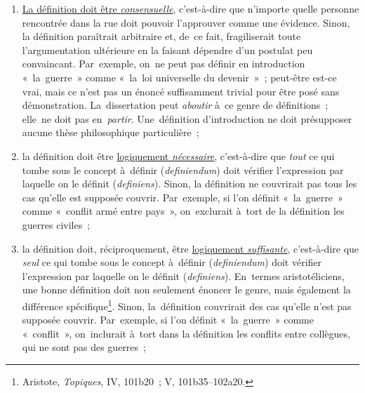 \documentclass[a4paper,12pt]{report}
\begin{document}
\begin{enumerate}
\item \uline{La définition doit être \emph{consensuelle}}, c'est-à-dire que n'importe
quelle personne rencontrée dans la rue doit pouvoir l'approuver comme
une évidence. Sinon, la définition paraîtrait arbitraire et, de ce
fait, fragiliserait toute l'argumentation ultérieure en la faisant
dépendre d'un postulat peu convaincant. Par exemple, on ne peut pas
définir en introduction « la guerre » comme « la loi universelle du
devenir » ; peut-être est-ce vrai, mais ce n'est pas un énoncé
suffisamment trivial pour être posé sans démonstration.
La dissertation peut \emph{aboutir} à ce genre de définitions ; elle ne
doit pas en \emph{partir}. Une définition d'introduction ne doit
présupposer aucune thèse philosophique particulière ;

\item la définition doit être \uline{logiquement \emph{nécessaire}}, c'est-à-dire que
\emph{tout} ce qui tombe sous le concept à définir (\emph{definiendum}​) doit
vérifier l'expression par laquelle on le définit (\emph{definiens}).
Sinon, la définition ne couvrirait pas tous les cas qu'elle est
supposée couvrir. Par exemple, si l'on définit « la guerre » comme
« conflit armé entre pays », on exclurait à tort de la définition les
guerres civiles ;

\item la définition doit, réciproquement, être \uline{logiquement \emph{suffisante}},
c'est-à-dire que \emph{seul} ce qui tombe sous le concept à définir
(\emph{definiendum}​) doit vérifier l'expression par laquelle on le définit
(\emph{definiens}). En termes aristotéliciens, une bonne définition doit
non seulement énoncer le genre, mais également la différence
spécifique\footnote{Aristote, \emph{Topiques}, IV, 101b20 ; V, 101b35--102a20.}. Sinon, la définition couvrirait des cas qu'elle
n'est pas supposée couvrir. Par exemple, si l'on définit
« la guerre » comme « conflit », on inclurait à tort dans la
définition les conflits entre collègues, qui ne sont pas des
guerres ;


\end{enumerate}
\end{document}
